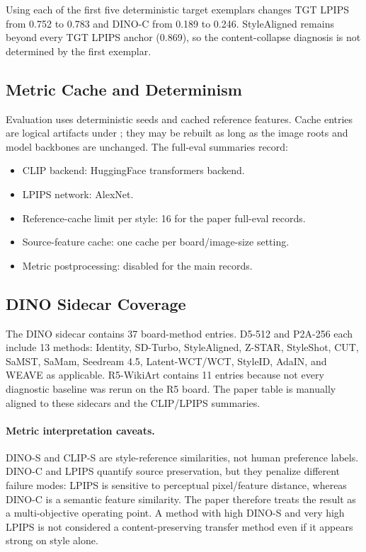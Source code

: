 \documentclass[10pt,twocolumn]{article}
\newcommand{\weave}{WEAVE}
\newcommand{\dinos}{DINO-S}
\newcommand{\dinoc}{DINO-C}
\newcommand{\clips}{CLIP-S}
\begin{document}
Using each of the first five deterministic target exemplars changes TGT LPIPS from 0.752
to 0.783 and \dinoc{} from 0.189 to 0.246. StyleAligned remains beyond every TGT LPIPS
anchor (0.869), so the content-collapse diagnosis is not determined by the first exemplar.

\subsection{Metric Cache and Determinism}

Evaluation uses deterministic seeds and cached reference features. Cache entries are
logical artifacts under ; they may be rebuilt as long as
the image roots and model backbones are unchanged. The full-eval summaries record:
\begin{itemize}[leftmargin=1.5em,itemsep=0.2em]
  \item CLIP backend: HuggingFace transformers backend.
  \item LPIPS network: AlexNet.
  \item Reference-cache limit per style: 16 for the paper full-eval records.
  \item Source-feature cache: one cache per board/image-size setting.
  \item Metric postprocessing: disabled for the main records.
\end{itemize}

\subsection{DINO Sidecar Coverage}

The DINO sidecar contains 37 board-method entries. D5-512 and P2A-256 each include 13
methods: Identity, SD-Turbo, StyleAligned, Z-STAR, StyleShot, CUT, SaMST, SaMam,
Seedream 4.5, Latent-WCT/WCT, StyleID, AdaIN, and \weave{} as applicable. R5-WikiArt
contains 11 entries because not every diagnostic baseline was rerun on the R5 board.
The paper table is manually aligned to these sidecars and the CLIP/LPIPS summaries.

\paragraph{Metric interpretation caveats.}
\dinos{} and \clips{} are style-reference similarities, not human preference labels.
\dinoc{} and LPIPS quantify source preservation, but they penalize different failure
modes: LPIPS is sensitive to perceptual pixel/feature distance, whereas \dinoc{} is a
semantic feature similarity. The paper therefore treats the result as a multi-objective
operating point. A method with high \dinos{} and very high LPIPS is not considered a
content-preserving transfer method even if it appears strong on style alone.
\end{document}
